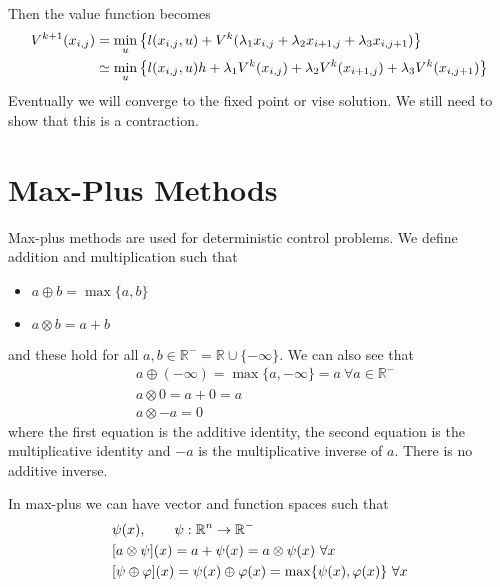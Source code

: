 Then the value function becomes
\begin{align}
\label{eq:17val}
V^{k+1}(x_{i,j}) &= \min_u\left\lbrace l(x_{i,j},u) + V^k(\lambda_1x_{i,j} + \lambda_2x_{i+1,j} + \lambda_3x_{i,j+1}) \right\rbrace \nonumber \\
&\simeq \min_u\left\lbrace l(x_{i,j},u)h + \lambda_1V^k(x_{i,j}) + \lambda_2V^k(x_{i+1,j}) + \lambda_3V^k(x_{i,j+1}) \right\rbrace
\end{align}
Eventually we will converge to the fixed point or vise solution.
We still need to show that this is a contraction.

\section{Max-Plus Methods}
Max-plus methods are used for deterministic control problems.
We define addition and multiplication such that
\begin{itemize}
\item $a\oplus b=\max\{a,b\}$
\item $a\otimes b = a+b$
\end{itemize}
and these hold for all $a,b\in\mathbb{R}^- = \mathbb{R}\cup\{-\infty\}$.
We can also see that
\begin{align*}
&a\oplus(-\infty) = \max\{a,-\infty\} = a~\forall a\in\mathbb{R}^- \\
&a\otimes0 = a+0=a \\
&a\otimes-a = 0
\end{align*}
where the first equation is the additive identity, the second equation is the multiplicative identity and $-a$ is the multiplicative inverse of $a$.
There is no additive inverse.

In max-plus we can have vector and function spaces such that
\begin{align*}
&\psi(x), \qquad \psi:\mathbb{R}^n\to\mathbb{R}^- \\
&[a\otimes \psi](x) = a+\psi(x) = a\otimes\psi(x)~\forall x \\
&[\psi\oplus\varphi](x) = \psi(x)\oplus\varphi(x) = \max\{\psi(x),\varphi(x)\}~\forall x
\end{align*}

